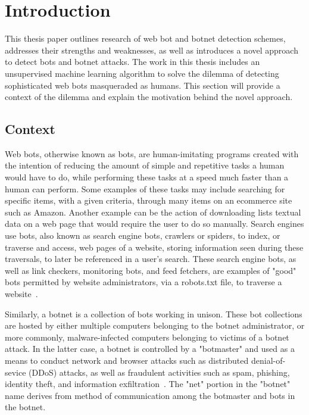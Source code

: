 ﻿
\chapter{Introduction}
This thesis paper outlines research of web bot and botnet detection schemes, addresses their strengths and weaknesses, as well as introduces a novel approach to detect bots and botnet attacks.
The work in this thesis includes an unsupervised machine learning algorithm to solve the dilemma of detecting sophisticated web bots masqueraded as humans. This section will provide a context of the dilemma and explain the motivation behind the novel approach. %

\section{Context}
Web bots, otherwise known as bots, are human-imitating programs created with the intention of reducing the amount of simple and repetitive tasks a human would have to do, while performing these tasks at a speed much faster than a human can perform.
Some examples of these tasks may include searching for specific items, with a given criteria, through many items on an ecommerce site such as Amazon.
Another example can be the action of downloading lists textual data on a web page that would require the user to do so manually.
Search engines use bots, also known as search engine bots, crawlers or spiders, to index, or traverse and access, web pages of a website, storing information seen during these traversals, to later be referenced in a user's search.
These search engine bots, as well as link checkers, monitoring bots, and feed fetchers, are examples of "good" bots permitted by website administrators, via a robots.txt file, to traverse a website~\cite{ROVETTA2020102577}.

Similarly, a botnet is a collection of bots working in unison.
These bot collections are hosted by either multiple computers belonging to the botnet administrator, or more commonly, malware-infected computers belonging to victims of a botnet attack.
In the latter case, a botnet is controlled by a "botmaster" and used as a means to conduct network and browser attacks such as distributed denial-of-sevice (DDoS) attacks, as well as fraudulent activities such as spam, phishing, identity theft, and information exfiltration~\cite{inproceedings}.
The "net" portion in the "botnet" name derives from method of communication among the botmaster and bots in the botnet.

